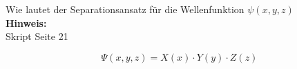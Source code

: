 \begin{question}[section=2,name={Separationsansatz 2},difficulty=,quantity=1,type=thr,tags={20151210,20130314,20061016}]
	Wie lautet der Separationsansatz für die Wellenfunktion $\psi(x, y, z)$
	\\ \textbf{Hinweis:}\\
	Skript Seite 21
\end{question}
\begin{solution}
	\begin{equation}
		\Psi(x,y,z) = X(x) \cdot Y(y)\cdot Z(z)
	\end{equation}
\end{solution}
